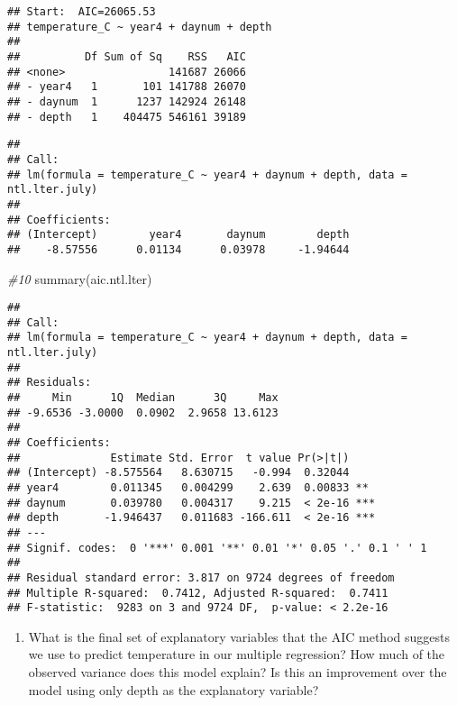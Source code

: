 \documentclass[
]{article}
\newenvironment{Shaded}{\begin{snugshade}}{\end{snugshade}}
\newcommand{\CommentTok}[1]{\textcolor[rgb]{0.56,0.35,0.01}{\textit{#1}}}
\newcommand{\FunctionTok}[1]{\textcolor[rgb]{0.00,0.00,0.00}{#1}}
\newcommand{\NormalTok}[1]{#1}
\providecommand{\tightlist}{%
  \setlength{\itemsep}{0pt}\setlength{\parskip}{0pt}}
\begin{document}
\begin{verbatim}
## Start:  AIC=26065.53
## temperature_C ~ year4 + daynum + depth
## 
##          Df Sum of Sq    RSS   AIC
## <none>                141687 26066
## - year4   1       101 141788 26070
## - daynum  1      1237 142924 26148
## - depth   1    404475 546161 39189
\end{verbatim}

\begin{verbatim}
## 
## Call:
## lm(formula = temperature_C ~ year4 + daynum + depth, data = ntl.lter.july)
## 
## Coefficients:
## (Intercept)        year4       daynum        depth  
##    -8.57556      0.01134      0.03978     -1.94644
\end{verbatim}

\begin{Shaded}
\begin{Highlighting}[]
\CommentTok{\#10}
\FunctionTok{summary}\NormalTok{(aic.ntl.lter)}
\end{Highlighting}
\end{Shaded}

\begin{verbatim}
## 
## Call:
## lm(formula = temperature_C ~ year4 + daynum + depth, data = ntl.lter.july)
## 
## Residuals:
##     Min      1Q  Median      3Q     Max 
## -9.6536 -3.0000  0.0902  2.9658 13.6123 
## 
## Coefficients:
##              Estimate Std. Error  t value Pr(>|t|)    
## (Intercept) -8.575564   8.630715   -0.994  0.32044    
## year4        0.011345   0.004299    2.639  0.00833 ** 
## daynum       0.039780   0.004317    9.215  < 2e-16 ***
## depth       -1.946437   0.011683 -166.611  < 2e-16 ***
## ---
## Signif. codes:  0 '***' 0.001 '**' 0.01 '*' 0.05 '.' 0.1 ' ' 1
## 
## Residual standard error: 3.817 on 9724 degrees of freedom
## Multiple R-squared:  0.7412, Adjusted R-squared:  0.7411 
## F-statistic:  9283 on 3 and 9724 DF,  p-value: < 2.2e-16
\end{verbatim}

\begin{enumerate}
\def\labelenumi{\arabic{enumi}.}
\setcounter{enumi}{10}
\tightlist
\item
  What is the final set of explanatory variables that the AIC method
  suggests we use to predict temperature in our multiple regression? How
  much of the observed variance does this model explain? Is this an
  improvement over the model using only depth as the explanatory
  variable?
\end{enumerate}
\end{document}
